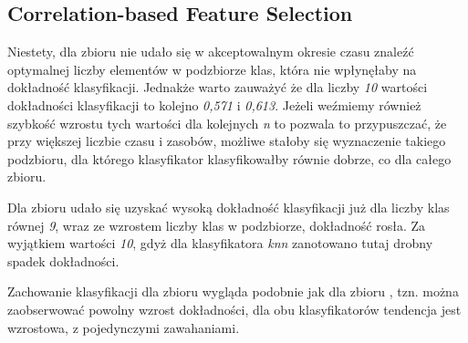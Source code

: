 \documentclass{classrep}
\begin{document}
{        \subsection{Correlation-based Feature Selection} {
Niestety, dla zbioru \cite{dataset_letters} nie udało się w akceptowalnym okresie czasu znaleźć optymalnej liczby elementów w podzbiorze klas, która nie wpłynęłaby na dokładność klasyfikacji. Jednakże warto zauważyć że dla liczby \textit{10} wartości dokładności klasyfikacji to kolejno \textit{0,571} i \textit{0,613}. Jeżeli weźmiemy również szybkość wzrostu tych wartości dla kolejnych \textit{n} to pozwala to przypuszczać, że przy większej liczbie czasu i zasobów, możliwe stałoby się wyznaczenie takiego podzbioru, dla którego klasyfikator klasyfikowałby równie dobrze, co dla całego zbioru.


Dla zbioru \cite{dataset_numerals} udało się uzyskać wysoką dokładność klasyfikacji już dla liczby klas równej \textit{9}, wraz ze wzrostem liczby klas w podzbiorze, dokładność rosła. Za wyjątkiem wartości \textit{10}, gdyż dla klasyfikatora \textit{knn} zanotowano tutaj drobny spadek dokładności.


Zachowanie klasyfikacji dla zbioru \cite{dataset_documents} wygląda podobnie jak dla zbioru \cite{dataset_letters}, tzn. można zaobserwować powolny wzrost dokładności, dla obu klasyfikatorów tendencja jest wzrostowa, z pojedynczymi zawahaniami. 
        }

    }
\end{document}
